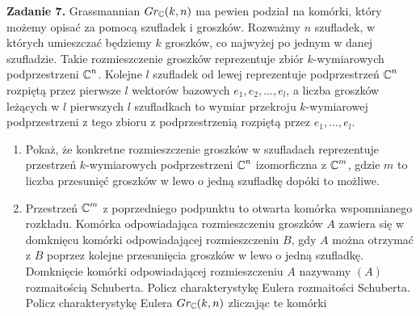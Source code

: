\textbf{\large\color{orange}Zadanie 7.} Grassmannian $Gr_{\operatorname{\mathbb{C}}}(k, n)$ ma pewien podział na komórki, który możemy opisać za pomocą szufladek i groszków. Rozważmy $n$ szufladek, w których umieszczać będziemy $k$ groszków, co najwyżej po jednym w danej szufladzie. Takie rozmieszczenie groszków reprezentuje zbiór $k$-wymiarowych podprzestrzeni $\operatorname{\mathbb{C}}^n$. Kolejne $l$ szufladek od lewej reprezentuje podprzestrzeń $\operatorname{\mathbb{C}}^n$ rozpiętą przez pierwsze $l$ wektorów bazowych $e_1, e_2,..., e_l$, a liczba groszków leżących w $l$ pierwszych $l$ szufladkach to wymiar przekroju $k$-wymiarowej podprzestrzeni z tego zbioru z podprzestrzenią rozpiętą przez $e_1,..., e_l$.
\begin{enumerate}[label=(\alph*)]
  \item Pokaż, że konkretne rozmieszczenie groszków w szufladach reprezentuje przestrzeń $k$-wymiarowych podprzestrzeni $\operatorname{\mathbb{C}}^n$ izomorficzna z $\operatorname{\mathbb{C}}^m$, gdzie $m$ to liczba przesunięć groszków w lewo o jedną szufladkę dopóki to możliwe.
  \item Przestrzeń $\operatorname{\mathbb{C}}^m$ z poprzedniego podpunktu to otwarta komórka wspomnianego rozkładu. Komórka odpowiadająca rozmieszczeniu groszków $A$ zawiera się w
domknięcu komórki odpowiadającej rozmieszczeniu $B$, gdy $A$ można otrzymać z $B$ poprzez kolejne przesunięcia groszków w lewo o jedną szufladkę.
Domknięcie komórki odpowiadającej rozmieszczeniu $A$ nazywamy $(A)$ rozmaitością Schuberta. Policz charakterystykę Eulera rozmaitości Schuberta.
Policz charakterystykę Eulera $Gr_{\operatorname{\mathbb{C}}}(k, n)$ zliczając te komórki
\end{enumerate}

\dotfill 

